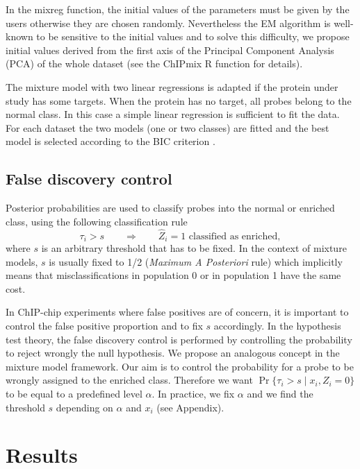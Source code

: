 \documentclass{bioinfo}
\begin{document}
In the mixreg function, the initial values of the parameters must be
given by the users otherwise they are chosen randomly. Nevertheless
the EM algorithm is well-known to be sensitive to the initial values \citep{Karlis03, Bohning03} and
to solve this difficulty, we propose initial values derived from the first
axis of the Principal Component Analysis (PCA) of the whole dataset
(see the ChIPmix R function for details).

The mixture model with two linear regressions is adapted if the
protein under study has some targets. When the protein has no
target, all probes belong to the normal class. In this case a simple
linear regression is sufficient to fit the data. For each dataset
the two models  (one or two classes) are fitted and the best model
is selected according to the BIC criterion \citep{Schwarz78}.

\subsection{False discovery control}  \label{fdc}
Posterior probabilities are used to classify probes into the normal
or enriched class, using the following classification rule
$$
{\tau}_{i} > s \qquad \Rightarrow \qquad \widehat{Z}_i=1 \text{ classified as enriched},
$$
where $s$ is an arbitrary  threshold that has to be fixed. In the
context of mixture models, $s$ is usually fixed to 1/2 ({\it Maximum
A Posteriori} rule) which implicitly means that misclassifications
in population 0 or in population 1 have the same cost.

In ChIP-chip experiments where false positives are of concern, it is
important to control the false positive proportion and to fix $s$
accordingly. In the hypothesis test theory, the false discovery
control is performed by controlling the probability to reject
wrongly the null hypothesis. We propose an analogous concept in the
mixture model framework. Our aim is to control the probability for a
probe to be wrongly assigned to the enriched class. Therefore we
want $\Pr\{\tau_{i} > s \;|\; x_i, Z_i =0\}$ to be equal to a
predefined level $\alpha$. In practice, we fix $\alpha$ and we find the
threshold $s$ depending on $\alpha$ and $x_i$ (see Appendix).




\section{Results}\label{appli}
\end{document}
